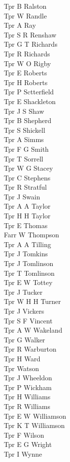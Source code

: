 \begin{multicols}{3}
  Tpr B Ralston \\
  Tpr W Randle \\
  Tpr A Ray \\
  Tpr S R Renshaw \\
  Tpr G T Richards \\
  Tpr R Richards \\
  Tpr W O Rigby \\
  Tpr E Roberts \\
  Tpr H Roberts \\
  Tpr P Sctterfield \\
  Tpr E Shackleton \\
  Tpr J S Shaw \\
  Tpr B Shepherd \\
  Tpr S Shickell \\
  Tpr A Simms \\
  Tpr F G Smith \\
  Tpr T Sorrell \\
  Tpr W G Stacey \\
  Tpr C Stephens \\
  Tpr R Stratful \\
  Tpr J Swain \\
  Tpr A A Taylor \\
  Tpr H H Taylor \\
  Tpr E Thomas \\
  Farr W Thompson \\
  Tpr A A Tilling \\
  Tpr J Tomkins \\
  Tpr J Tomlinson \\
  Tpr T Tomlinson \\
  Tpr E W Tottey \\
  Tpr J Tucker \\
  Tpr W H H Turner \\
  Tpr J Vickers \\
  Tpr S F Vincent \\
  Tpr A W Wakeland \\
  Tpr G Walker \\
  Tpr R Warburton \\
  Tpr H Ward \\
  Tpr Watson \\
  Tpr J Wheeldon \\
  Tpr P Wickham \\
  Tpr H Williams \\
  Tpr R Williams \\
  Tpr E W Williamson \\
  Tpr K T Williamson \\
  Tpr F Wilson \\
  Tpr E G Wright \\
  Tpr I Wynne \\
\end{multicols}
